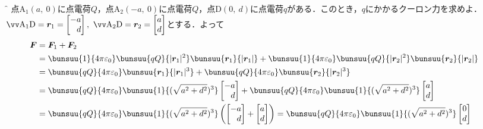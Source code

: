 \begin{enumerate}[leftmargin=18pt, labelsep=10pt, itemindent=9pt]
	\item[\f{例}] 点$\mathrm{A}_1(a,\ 0)$に点電荷$Q$，点$\mathrm{A}_2(-a,\ 0)$に点電荷$Q$，点$\mathrm{D}(0,\ d)$に点電荷$q$がある．このとき，$q$にかかるクーロン力を求めよ．\\
		$\vecrm{A_1 D} = \bm{r}_1 = \begin{bmatrix*}[r] -a\\ d \end{bmatrix*},\ \vecrm{A_2 D} = \bm{r}_2 = \begin{bmatrix*}[r] a\\ d \end{bmatrix*}$とする．よって
		\begin{align*}
			\bm{F} &= \bm{F}_1 + \bm{F}_2\\
				&= \bunsuu{1}{4\pi\varepsilon_0}\bunsuu{qQ}{|\bm{r}_1|^2}\bunsuu{\bm{r}_1}{|\bm{r}_1|} + \bunsuu{1}{4\pi\varepsilon_0}\bunsuu{qQ}{|\bm{r}_2|^2}\bunsuu{\bm{r}_2}{|\bm{r}_2|}\\
				&= \bunsuu{qQ}{4\pi\varepsilon_0}\bunsuu{\bm{r}_1}{|\bm{r}_1|^3} + \bunsuu{qQ}{4\pi\varepsilon_0}\bunsuu{\bm{r}_2}{|\bm{r}_2|^3}\\
				&= \bunsuu{qQ}{4\pi\varepsilon_0}\bunsuu{1}{(\sqrt{a^2 + d^2})^3}
				\begin{bmatrix*}[r]
					-a\\ d
				\end{bmatrix*}
				+ \bunsuu{qQ}{4\pi\varepsilon_0}\bunsuu{1}{(\sqrt{a^2 + d^2})^3}
				\begin{bmatrix*}[r]
					a\\ d
				\end{bmatrix*}
				\\
				&= \bunsuu{qQ}{4\pi\varepsilon_0}\bunsuu{1}{(\sqrt{a^2 + d^2})^3}\left(
					\begin{bmatrix*}[r]
						-a\\ d
					\end{bmatrix*}
					+
					\begin{bmatrix*}[r]
						a\\ d
					\end{bmatrix*}
				\right) = \bunsuu{qQ}{4\pi\varepsilon_0}\bunsuu{1}{(\sqrt{a^2 + d^2})^3}
					\begin{bmatrix*}[r]
						0\\ d
					\end{bmatrix*}
		\end{align*}
\end{enumerate}



